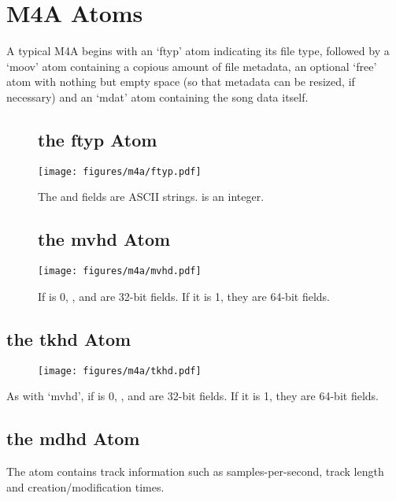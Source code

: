 \section{M4A Atoms}
A typical M4A begins with an `ftyp' atom indicating its file type,
followed by a `moov' atom containing a copious amount of file metadata,
an optional `free' atom with nothing but empty space
(so that metadata can be resized, if necessary) and an `mdat' atom
containing the song data itself.
\begin{figure}[h]
\subsection{the ftyp Atom}
\texttt{[image: figures/m4a/ftyp.pdf]}
\par
The  and  fields are ASCII strings.
 is an integer.

\subsection{the mvhd Atom}
\texttt{[image: figures/m4a/mvhd.pdf]}
\par
If  is 0, ,  and
 are 32-bit fields.  If it is 1, they are 64-bit fields.
\end{figure}

\clearpage

\subsection{the tkhd Atom}
\par
\begin{figure}[h]
\texttt{[image: figures/m4a/tkhd.pdf]}
\end{figure}
\par
\noindent
As with `mvhd', if  is 0, ,
 and  are 32-bit fields.
If it is 1, they are 64-bit fields.

\subsection{the mdhd Atom}

The  atom contains track information such as samples-per-second,
track length and creation/modification times.

